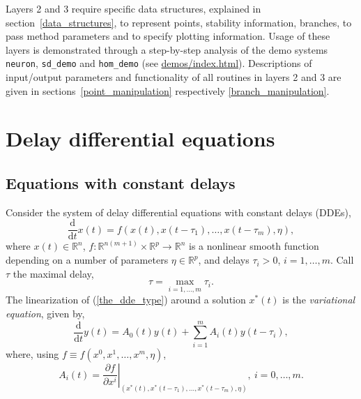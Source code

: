 \documentclass[10pt]{scrartcl}
\newcommand{\define}[1]{\emph{#1}}
\newcommand{\demobase}{\url{demos/index.html}}
\renewcommand{\d}{\mathrm{d}}
\newcommand{\RR}{\mathbb{R}}
\begin{document}
Layers 2 and 3 require specific data structures, explained in
section~\ref{data_structures}, to represent points, stability
information, branches, to pass method parameters and to specify
plotting information.  Usage of these layers is
demonstrated %
through a step-by-step analysis of the demo systems \texttt{neuron},
\texttt{sd\_demo} and \texttt{hom\_demo} (see
\demobase{}).  Descriptions of input/output parameters and
functionality of all routines in layers 2 and 3 are given in
sections~\ref{point_manipulation} respectively
\ref{branch_manipulation}.

\section{Delay differential equations}\label{explain_dde}
\label{sec:ddes}
\subsection{Equations with constant delays}\label{dde}

Consider the system of delay differential equations with constant
delays (DDEs),
\begin{equation}\label{the_dde_type}
\frac{\d}{\d t}{x(t)}=f(x(t),x(t-\tau_1),\ldots,x(t-\tau_m),\eta),
\end{equation}
where $x(t)\in\RR^n$, $f:\RR^{n(m+1)}\times\RR^p
\rightarrow\RR^n$ is a nonlinear smooth function
depending on a number of parameters $\eta\in\RR^p$, and delays
$\tau_i>0$, $i=1,\ldots,m$.
Call $\tau$ the maximal delay,
\[
\tau=\max_{i=1,\ldots,m}\tau_i.
\]
The linearization of (\ref{the_dde_type}) around a solution $x^*(t)$ 
is the \define{variational equation}, given by,
\begin{equation}\label{the_var_equa}
\frac{\d}{\d t}{y(t)}=A_0(t)y(t)+\sum_{i=1}^m A_i(t)y(t-\tau_i),
\end{equation}
where, using $f\equiv f(x^0,x^1,\ldots,x^m,\eta)$,  
\begin{equation}\label{A_def}
A_i(t)=\left.\frac{\partial f}{\partial x^i}
\right|_{(x^*(t),x^*(t-\tau_1),\ldots,x^*(t-\tau_m),\eta)}, 
\ i=0,\ldots,m. 
\end{equation}
\end{document}
